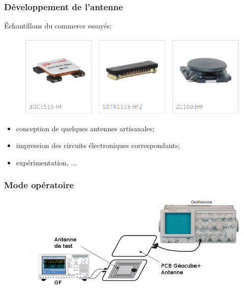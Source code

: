 \documentclass{beamer}
\begin{document}
\subsubsection{Développement de l'antenne}



\begin{frame}

Échantillons du commerce essayés:
\begin{figure}
\centering
\includegraphics[scale=0.5]{images/antennas.png}
\end{figure}
\begin{itemize}
\item conception de quelques antennes artisanales;
\item impression des circuits électroniques correspondants;
\item expérimentation, ...
\end{itemize}
\end{frame}

\begin{frame}
\frametitle{Mode opératoire}
\begin{figure}
\centering
\includegraphics[scale=0.4]{images/gbfoscillo.png}
\end{figure}
\end{frame}
\end{document}
